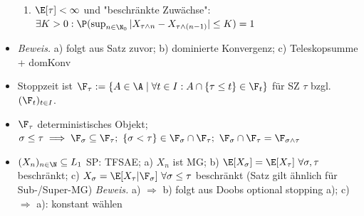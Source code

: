 \begin{itemize}
\begin{enumerate}
			\item $\E[\tau]<\infty$ und "beschränkte Zuwächse": $\exists K>0:\P(\sup_{n\in\N_0}|X_{\tau\wedge n}-X_{\tau\wedge(n-1)}|\leq K)=1$
		\end{enumerate}
		\item \textit{Beweis.} a) folgt aus Satz zuvor; b) dominierte Konvergenz; c) Teleskopsumme + domKonv
		\item Stoppzeit  ist $\F_\tau:=\lbrace	A\in\A\mid\forall t\in I:A\cap\lbrace\tau\leq t\rbrace\in\F_t\rbrace$ für SZ $\tau$ bzgl. $(\F_t)_{t\in I}$.
		\item $\F_\tau$ deterministisches Objekt; $\sigma\leq\tau\implies\F_\sigma\subseteq\F_\tau;~\lbrace\sigma<\tau\rbrace\in\F_\sigma\cap\F_\tau;~\F_\sigma\cap\F_\tau=\F_{\sigma\wedge\tau}$
		\item {} $(X_n)_{n\in\N}\subseteq L_1$ SP: TFSAE; a) $X_n$ ist MG; b) $\E[X_\sigma]=\E[X_\tau]~\forall\sigma,\tau$ beschränkt; c) $X_\sigma=\E[X_\tau|\F_\sigma]~\forall \sigma\leq\tau$ beschränkt (Satz gilt ähnlich für Sub-/Super-MG)
		\textit{Beweis.} a) $\Rightarrow$ b) folgt aus Doobs optional stopping a); c) $\Rightarrow$ a): konstant wählen
	\end{itemize}
	
